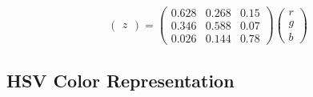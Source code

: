 \documentclass[twocolumn,landscape,10pt]{article}
\theoremstyle{definition}
\begin{document}
\begin{itemize}
\[\begin{pmatrix}
                z
            \end{pmatrix} 
            =
            \begin{pmatrix}
                0.628 & 0.268 & 0.15 \\
                0.346 & 0.588 & 0.07 \\
                0.026 & 0.144 & 0.78
            \end{pmatrix} 
            \begin{pmatrix}
                r \\
                g \\
                b
            \end{pmatrix} 
        \]
\end{itemize} 

\subsection{HSV Color Representation}
\end{document}
